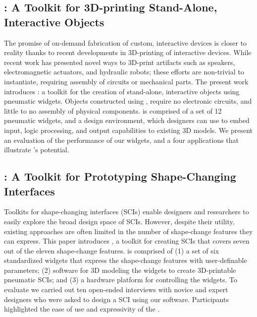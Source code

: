     \subsection*{\al: A Toolkit for 3D-printing Stand-Alone, Interactive Objects}
      The promise of on-demand fabrication of custom, interactive devices is
      closer to reality thanks to recent developments in 3D-printing of
      interactive devices. While recent work has presented novel ways to
      3D-print artifacts such as speakers, electromagnetic actuators, and
      hydraulic robots; these efforts are non-trivial to instantiate,
      requiring assembly of circuits or mechanical parts. The present work
      introduces \al: a toolkit for the creation of stand-alone,
      interactive objects using pneumatic widgets. Objects constructed using
      \al, require no electronic circuits, and little to no assembly of
      physical components. \al is comprised of a set of 12 pneumatic
      widgets, and a design environment, which designers can use to embed
      input, logic processing, and output capabilities to existing 3D models.
      We present an evaluation of the performance of our widgets, and a four
      applications that illustrate \al's potential.

    \subsection*{\mp: A Toolkit for Prototyping Shape-Changing
      Interfaces}
      Toolkits for shape-changing interfaces (SCIs) enable designers and
      researchers to easily explore the broad design space of SCIs. However,
      despite their utility, existing approaches are often limited in the
      number of shape-change features they can express. This paper introduces
      \mp, a toolkit for creating SCIs that covers seven out of the
      eleven shape-change features. \mp is comprised of (1) a set
      of six standardized widgets that express the shape-change features with
      user-definable parameters; (2) software for 3D modeling the widgets to
      create 3D-printable pneumatic SCIs; and (3) a hardware platform for
      controlling the widgets. To evaluate \mp we carried out ten
      open-ended interviews with novice and expert designers who were asked
      to design a SCI using our software. Participants highlighted the ease
      of use and expressivity of the \mp.